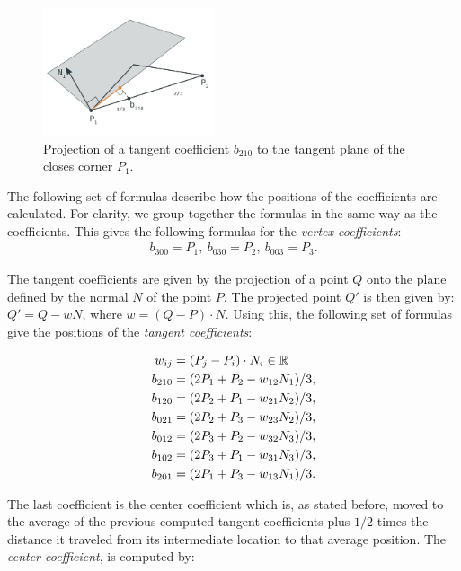 \begin{figure}
	\centering
	\includegraphics[width=0.45\textwidth]{./content/img/method/geometry_tangent_projection.png}
	\caption{Projection of a tangent coefficient $b_{210}$ to the tangent plane of the closes corner $P_1$.}
	\label{fig:method:geometry_tangent_projection.png}
\end{figure}

The following set of formulas describe how the positions of the coefficients are calculated. For clarity, we group together the formulas in the same way as the coefficients. This gives the following formulas for the \textit{vertex coefficients}:
\begin{align}\label{eq:method:vertex_coefficients}
	b_{300} = P_1,\ b_{030} = P_2,\ b_{003} = P_3.
\end{align}

The tangent coefficients are given by the projection of a point $Q$ onto the plane defined by the normal $N$ of the point $P$. The projected point $Q'$ is then given by: $Q' = Q - wN$, where $w = (Q - P) \cdot N$. Using this, the following set of formulas give the positions of the \textit{tangent coefficients}:

\begin{align}\label{eq:method:tangent_coefficients}
	w_{ij} = {}& (P_j - P_i) \cdot N_i \in \mathbb{R} \nonumber\\
	b_{210} = {}& (2 P_1 + P_2 - w_{12}N_1) / 3,\nonumber\\
	b_{120} = {}& (2 P_2 + P_1 - w_{21}N_2) / 3,\nonumber\\
	b_{021} = {}& (2 P_2 + P_3 - w_{23}N_2) / 3, \\
	b_{012} = {}& (2 P_3 + P_2 - w_{32}N_3) / 3,\nonumber\\
	b_{102} = {}& (2 P_3 + P_1 - w_{31}N_3) / 3,\nonumber\\
	b_{201} = {}& (2 P_1 + P_3 - w_{13}N_1) / 3. \nonumber
\end{align}

The last coefficient is the center coefficient which is, as stated before, moved to the average of the previous computed tangent coefficients plus $1/2$ times the distance it traveled from its intermediate location to that average position. The \textit{center coefficient}, is computed by:

